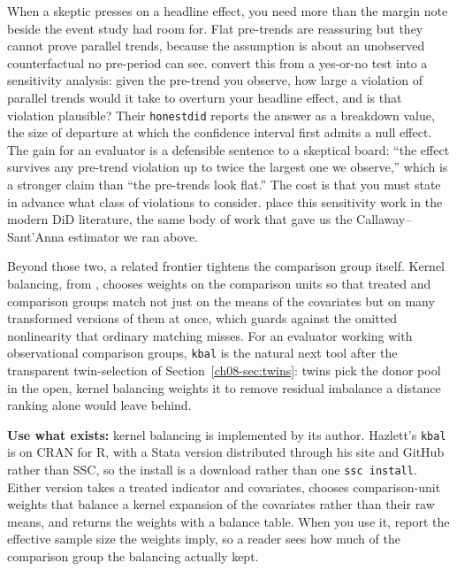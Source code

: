 \documentclass[
    a4paper,
    fontsize=10pt,
    twoside=true,
    numbers=noenddot,
]{kaobook}
\begin{document}
When a skeptic presses on a headline effect, you need more than the margin note beside the event study had room for. Flat pre-trends are reassuring but they cannot prove parallel trends, because the assumption is about an unobserved counterfactual no pre-period can see. \textcite{rambachan2023honest} convert this from a yes-or-no test into a sensitivity analysis: given the pre-trend you observe, how large a violation of parallel trends would it take to overturn your headline effect, and is that violation plausible? Their \texttt{honestdid} reports the answer as a breakdown value, the size of departure at which the confidence interval first admits a null effect. The gain for an evaluator is a defensible sentence to a skeptical board: \enquote{the effect survives any pre-trend violation up to twice the largest one we observe,} which is a stronger claim than \enquote{the pre-trends look flat.} The cost is that you must state in advance what class of violations to consider. \textcite{roth2023trending} place this sensitivity work in the modern DiD literature, the same body of work that gave us the Callaway--Sant'Anna estimator we ran above.

Beyond those two, a related frontier tightens the comparison group itself. Kernel balancing, from \textcite{hazlett2020kernel}, chooses weights on the comparison units so that treated and comparison groups match not just on the means of the covariates but on many transformed versions of them at once, which guards against the omitted nonlinearity that ordinary matching misses. For an evaluator working with observational comparison groups, \texttt{kbal} is the natural next tool after the transparent twin-selection of Section~\ref{ch08-sec:twins}: twins pick the donor pool in the open, kernel balancing weights it to remove residual imbalance a distance ranking alone would leave behind.

\begin{kaobox}[frametitle=Existing tool: kernel balancing with \texttt{kbal}]
\textbf{Use what exists:} kernel balancing is implemented by its author. Hazlett's \texttt{kbal} is on CRAN for R, with a Stata version distributed through his site and GitHub rather than SSC, so the install is a download rather than one \texttt{ssc install}. Either version takes a treated indicator and covariates, chooses comparison-unit weights that balance a kernel expansion of the covariates rather than their raw means, and returns the weights with a balance table. When you use it, report the effective sample size the weights imply, so a reader sees how much of the comparison group the balancing actually kept.
\end{kaobox}
\end{document}
